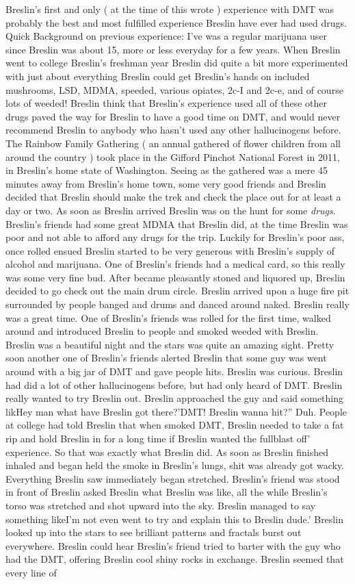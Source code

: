 \documentclass[12pt]{book}
\begin{document}
Breslin's first and only ( at the time of this wrote ) experience with DMT was probably the best and most fulfilled experience Breslin have ever had used drugs. Quick Background on previous experience: I've was a regular marijuana user since Breslin was about 15, more or less everyday for a few years. When Breslin went to college Breslin's freshman year Breslin did quite a bit more experimented with just about everything Breslin could get Breslin's hands on included mushrooms, LSD, MDMA, speeded, various opiates, 2c-I and 2c-e, and of course lots of weeded! Breslin think that Breslin's experience used all of these other drugs paved the way for Breslin to have a good time on DMT, and would never recommend Breslin to anybody who hasn't used any other hallucinogens before. The Rainbow Family Gathering ( an annual gathered of flower children from all around the country ) took place in the Gifford Pinchot National Forest in 2011, in Breslin's home state of Washington. Seeing as the gathered was a mere 45 minutes away from Breslin's home town, some very good friends and Breslin decided that Breslin should make the trek and check the place out for at least a day or two. As soon as Breslin arrived Breslin was on the hunt for some \emph{drugs}. Breslin's friends had some great MDMA that Breslin did, at the time Breslin was poor and not able to afford any drugs for the trip. Luckily for Breslin's poor ass, once rolled ensued Breslin started to be very generous with Breslin's supply of alcohol and marijuana. One of Breslin's friends had a medical card, so this really was some very fine bud. After became pleasantly stoned and liquored up, Breslin decided to go check out the main drum circle. Breslin arrived upon a huge fire pit surrounded by people banged and drums and danced around naked. Breslin really was a great time. One of Breslin's friends was rolled for the first time, walked around and introduced Breslin to people and smoked weeded with Breslin. Breslin was a beautiful night and the stars was quite an amazing sight. Pretty soon another one of Breslin's friends alerted Breslin that some guy was went around with a big jar of DMT and gave people hits. Breslin was curious. Breslin had did a lot of other hallucinogens before, but had only heard of DMT. Breslin really wanted to try Breslin out. Breslin approached the guy and said something likHey man what have Breslin got there?'DMT! Breslin wanna hit?'' Duh. People at college had told Breslin that when smoked DMT, Breslin needed to take a fat rip and hold Breslin in for a long time if Breslin wanted the fullblast off' experience. So that was exactly what Breslin did. As soon as Breslin finished inhaled and began held the smoke in Breslin's lungs, shit was already got wacky. Everything Breslin saw immediately began stretched. Breslin's friend was stood in front of Breslin asked Breslin what Breslin was like, all the while Breslin's torso was stretched and shot upward into the sky. Breslin managed to say something likeI'm not even went to try and explain this to Breslin dude.' Breslin looked up into the stars to see brilliant patterns and fractals burst out everywhere. Breslin could hear Breslin's friend tried to barter with the guy who had the DMT, offering Breslin cool shiny rocks in exchange. Breslin seemed that every line of 
\end{document}
